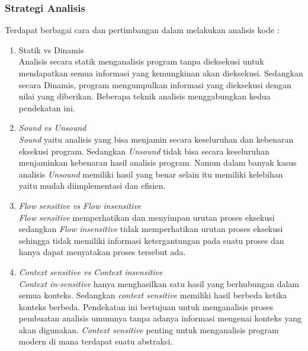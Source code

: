 \subsubsection{Strategi Analisis}
Terdapat berbagai cara dan pertimbangan dalam melakukan analisis kode \cite{208}:
\begin{enumerate}[leftmargin=1.3cm]
	\item Statik vs Dinamis\\
	Analisis secara statik menganalisis program tanpa dieksekusi untuk mendapatkan semua informasi yang kemungkinan akan dieksekusi. Sedangkan secara Dinamis, program mengumpulkan informasi yang dieksekusi dengan nilai yang diberikan. Beberapa teknik analisis menggabungkan kedua pendekatan ini.
	\item \textit{Sound vs Unsound}\\
	\textit{Sound} yaitu analisis yang bisa menjamin secara keseluruhan dan kebenaran eksekusi program. Sedangkan \textit{Unsound} tidak bisa secara keseluruhan menjaminkan kebenaran hasil analisis program. Namun dalam banyak kasus analisis \textit{Unsound} memiliki hasil yang benar selain itu memiliki kelebihan yaitu mudah diimplementasi dan efisien.
	\item \textit{Flow sensitive vs Flow insensitive}\\
	\textit{Flow sensitive} memperhatikan dan menyimpan urutan proses eksekusi sedangkan \textit{Flow insensitive} tidak memperhatikan urutan proses eksekusi sehingga tidak memiliki informasi ketergantungan pada suatu proses dan hanya dapat menyatakan proses tersebut ada.
	\item \textit{Context sensitive vs Context insensitive}\\
	\textit{Context in-sensitive} hanya menghasilkan satu hasil yang berhubungan dalam semua konteks. Sedangkan \textit{context sensitive} memiliki hasil berbeda ketika konteks berbeda. Pendekatan ini bertujuan untuk menganalisis proses pembuatan analisis umumnya tanpa adanya informasi mengenai konteks yang akan digunakan. \textit{Context sensitive} penting untuk menganalisis program modern di mana terdapat suatu abstraksi.
\end{enumerate}

